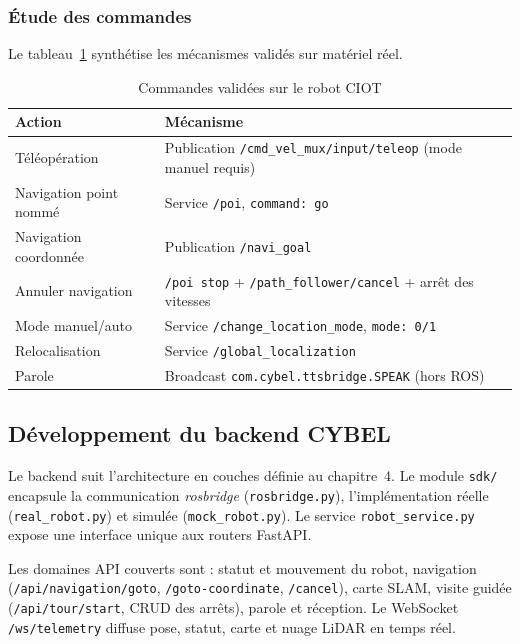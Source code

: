 \subsubsection{Étude des commandes}

Le tableau~\ref{tab:commandes_validees} synthétise les mécanismes validés sur
matériel réel.

\begin{table}[H]
\centering
\small
\caption{Commandes validées sur le robot CIOT}
\label{tab:commandes_validees}
\begin{tabular}{|p{3.0cm}|p{8.5cm}|}
\hline
\textbf{Action} & \textbf{Mécanisme} \\
\hline
{\raggedright Téléopération} & {\raggedright Publication \texttt{/cmd\_vel\_mux/input/teleop} (mode manuel requis)} \\
\hline
{\raggedright Navigation point nommé} & {\raggedright Service \texttt{/poi}, \texttt{command: go}} \\
\hline
{\raggedright Navigation coordonnée} & {\raggedright Publication \texttt{/navi\_goal}} \\
\hline
{\raggedright Annuler navigation} & {\raggedright \texttt{/poi stop} + \texttt{/path\_follower/cancel} + arrêt des vitesses} \\
\hline
{\raggedright Mode manuel/auto} & {\raggedright Service \texttt{/change\_location\_mode}, \texttt{mode: 0/1}} \\
\hline
{\raggedright Relocalisation} & {\raggedright Service \texttt{/global\_localization}} \\
\hline
{\raggedright Parole} & {\raggedright Broadcast \texttt{com.cybel.ttsbridge.SPEAK} (hors ROS)} \\
\hline
\end{tabular}
\end{table}


\subsection{Développement du backend CYBEL}

Le backend suit l'architecture en couches définie au chapitre~4. Le module
\texttt{sdk/} encapsule la communication \textit{rosbridge}
(\texttt{rosbridge.py}), l'implémentation réelle (\texttt{real\_robot.py}) et
simulée (\texttt{mock\_robot.py}). Le service \texttt{robot\_service.py}
expose une interface unique aux routers FastAPI.

Les domaines API couverts sont : statut et mouvement du robot, navigation
(\texttt{/api/navigation/goto}, \texttt{/goto-coordinate}, \texttt{/cancel}),
carte SLAM, visite guidée (\texttt{/api/tour/start}, CRUD des arrêts), parole
et réception. Le WebSocket \texttt{/ws/telemetry} diffuse pose, statut, carte
et nuage LiDAR en temps réel.

